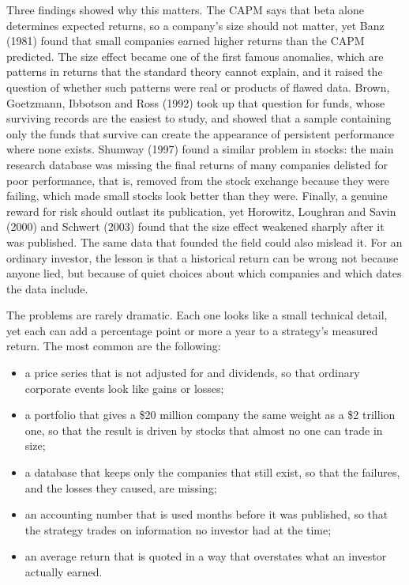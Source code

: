 Three findings showed why this matters. The CAPM says that beta alone determines expected returns, so a company's size should not matter, yet Banz (1981) found that small companies earned higher returns than the CAPM predicted. The size effect became one of the first famous anomalies, which are patterns in returns that the standard theory cannot explain, and it raised the question of whether such patterns were real or products of flawed data. Brown, Goetzmann, Ibbotson and Ross (1992) took up that question for funds, whose surviving records are the easiest to study, and showed that a sample containing only the funds that survive can create the appearance of persistent performance where none exists. Shumway (1997) found a similar problem in stocks: the main research database was missing the final returns of many companies delisted for poor performance, that is, removed from the stock exchange because they were failing, which made small stocks look better than they were. Finally, a genuine reward for risk should outlast its publication, yet Horowitz, Loughran and Savin (2000) and Schwert (2003) found that the size effect weakened sharply after it was published. The same data that founded the field could also mislead it. For an ordinary investor, the lesson is that a historical return can be wrong not because anyone lied, but because of quiet choices about which companies and which dates the data include.

The problems are rarely dramatic. Each one looks like a small technical detail, yet each can add a percentage point or more a year to a strategy's measured return. The most common are the following:

\begin{itemize}
  \item a price series that is not adjusted for  and dividends, so that ordinary corporate events look like gains or losses;
  \item a portfolio that gives a \$20 million company the same weight as a \$2 trillion one, so that the result is driven by stocks that almost no one can trade in size;
  \item a database that keeps only the companies that still exist, so that the failures, and the losses they caused, are missing;
  \item an accounting number that is used months before it was published, so that the strategy trades on information no investor had at the time;
  \item an average return that is quoted in a way that overstates what an investor actually earned.
\end{itemize}

